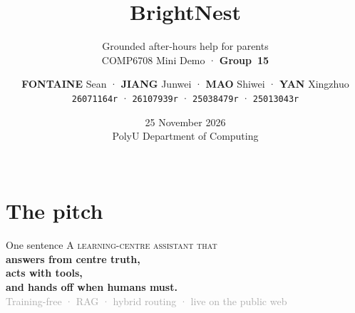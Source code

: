 \documentclass{beamer}
\title{BrightNest}
\subtitle{Grounded after-hours help for parents\\[0.2em]
{\normalsize COMP6708 Mini Demo · \textbf{Group~15}}}
\author{%
  {\footnotesize
  \textbf{FONTAINE} Sean ·
  \textbf{JIANG} Junwei ·
  \textbf{MAO} Shiwei ·
  \textbf{YAN} Xingzhuo}\\[0.2em]
  {\scriptsize\texttt{26071164r} · \texttt{26107939r} · \texttt{25038479r} · \texttt{25013043r}}%
}
\date{%
  25 November 2026\\[0.35em]
  {\footnotesize PolyU Department of Computing}\\[0.4em]
  \complogo\\[0.35em]
  {\scriptsize\bhref{https://seanfontaine.dev/COMP6708_A3_Demo}{seanfontaine.dev/COMP6708\_A3\_Demo}}%
}
\begin{document}
{
  \maketitle
}

\section{The pitch}

\begin{frame}{One sentence}{\thesection}
  \vfill
  \centering
  {\Large\scshape A learning-centre assistant that}\\[0.65em]
  {\LARGE\bfseries\color{maincolor} answers from centre truth,}\\[0.4em]
  {\LARGE\bfseries\color{maincolor} acts with tools,}\\[0.4em]
  {\LARGE\bfseries\color{maincolor} and hands off when humans must.}\\[1.2em]
  {\normalsize\textcolor{darkgray}{Training-free · RAG · hybrid routing · live on the public web}}
  \vfill
\end{frame}
\end{document}
